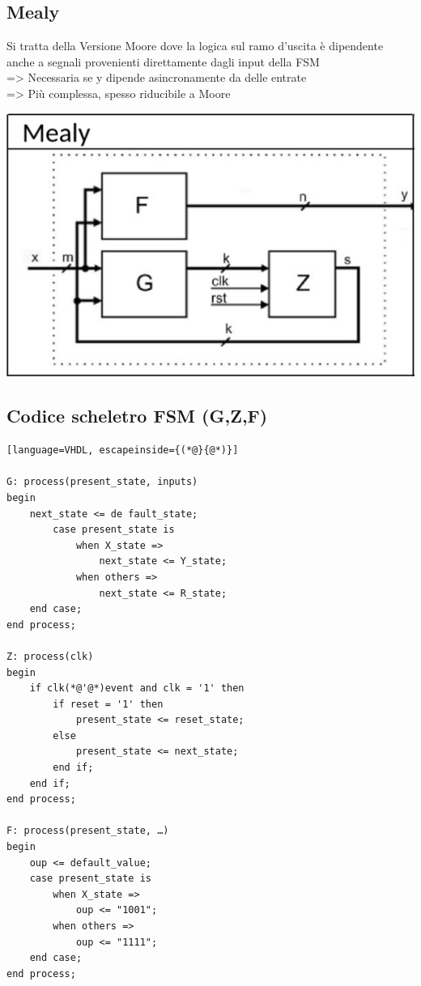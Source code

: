     \subsection{Mealy}
    \begin{minipage}[t]{0.48\columnwidth}
        \vspace{0pt} %
        Si tratta della Versione Moore dove la logica sul ramo d'uscita è dipendente anche a segnali provenienti direttamente
        dagli input della FSM\\
        => Necessaria se y dipende asincronamente da delle entrate\\
        => Più complessa, spesso riducibile a Moore
    \end{minipage}%
    \hfill
    \begin{minipage}[t]{0.48\columnwidth}
        \vspace{0pt} %
        \includegraphics[width=\linewidth]{Images/Mealy.png}
    \end{minipage}


    \subsection{Codice scheletro FSM (G,Z,F)}
        \begin{lstlisting}[language=VHDL, escapeinside={(*@}{@*)}]

G: process(present_state, inputs)
begin
    next_state <= de fault_state;
        case present_state is
            when X_state =>
                next_state <= Y_state;
            when others =>
                next_state <= R_state;
    end case;
end process;

Z: process(clk)
begin
    if clk(*@'@*)event and clk = '1' then
        if reset = '1' then
            present_state <= reset_state;
        else
            present_state <= next_state;
        end if;
    end if;
end process;

F: process(present_state, …)
begin
    oup <= default_value;
    case present_state is
        when X_state =>
            oup <= "1001";
        when others =>
            oup <= "1111";
    end case;
end process;

        \end{lstlisting}



